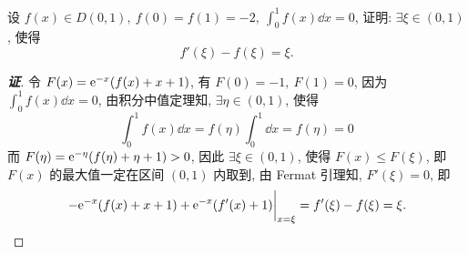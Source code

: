 
\begin{example}
    设 $f(x)\in D(0,1),~f(0)=f(1)=-2,~\displaystyle\int_{0}^{1}f(x)\dd x=0$, 证明: $\exists\xi\in(0,1)$, 使得 $$f'(\xi)-f(\xi)=\xi.$$
\end{example}
\begin{proof}[{\songti \textbf{证}}]
    令 $F(x)=\mathrm{e}^{-x}(f(x)+x+1)$, 有 $F(0)=-1,~F(1)=0$, 因为 $\displaystyle\int_{0}^{1}f(x)\dd x=0$, 由积分中值定理知, $\exists\eta\in(0,1)$, 使得
    $$\displaystyle\int_{0}^{1}f(x)\dd x=f(\eta)\int_{0}^{1}\dd x=f(\eta)=0$$
    而 $F(\eta)=\mathrm{e}^{-\eta}(f(\eta)+\eta+1)>0$, 因此 $\exists\xi\in(0,1)$, 使得 $F(x)\leqslant F(\xi)$, 即 $F(x)$ 的最大值一定在区间 $(0,1)$ 内取到,
    由 Fermat 引理知, $F'(\xi)=0$, 即 $$\eval{-\e^{-x}(f(x)+x+1)+\e^{-x}(f'(x)+1)}_{x=\xi}=f'(\xi)-f(\xi)=\xi.$$
\end{proof}


